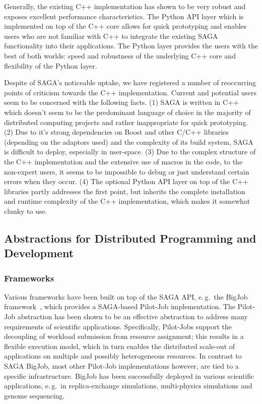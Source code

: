 \documentclass{article}
\begin{document}
Generally, the existing C++ implementation has shown to be very robust
and exposes excellent performance characteristics. The Python API
layer which is implemented on top of the C++ core allows for quick
prototyping and enables users who are not familiar with C++ to
integrate the existing SAGA functionality into their applications. The
Python layer provides the users with the best of both worlds: speed
and robustness of the underlying C++ core and flexibility of the
Python layer.

Despite of SAGA's noticeable uptake, we have registered a number of
reoccurring points of criticism towards the C++
implementation. Current and potential users seem to be concerned with
the following facts. (1) SAGA is written in C++ which doesn't seem to
be the predominant language of choice in the majority of distributed
computing projects and rather inappropriate for quick prototyping. (2)
Due to it's strong dependencies on Boost and other C/C++ libraries
(depending on the adaptors used) and the complexity of its build
system, SAGA is difficult to deploy, especially in user-space. (3) Due
to the complex structure of the C++ implementation and the extensive
use of macros in the code, to the non-expert users, it seems to be
impossible to debug or just understand certain errors when they
occur.  (4) The optional Python API layer on top of the C++ libraries partly 
addresses the first point, but inherits the complete installation and 
runtime complexity of the C++ implementation, which makes it somewhat clunky to use.

\subsection{Abstractions for Distributed Programming and
  Development}

\subsubsection{Frameworks}

Various frameworks have been built on top of the SAGA API, e.\,g.\ the BigJob
framework~\cite{saga_bigjob_condor_cloud}, which provides a SAGA-based
Pilot-Job implementation. The Pilot-Job abstraction has been shown to be an
effective abstraction to address many requirements of scientific applications.
Specifically, Pilot-Jobs support the decoupling of workload submission from
resource assignment; this results in a flexible execution model, which in turn
enables the distributed scale-out of applications on multiple and possibly
heterogeneous resources. In contrast to SAGA BigJob, most other Pilot-Job
implementations however, are tied to a specific infrastructure. BigJob has 
been successfully deployed in various scientific applications, e.\,g.\ in 
replica-exchange simulations, multi-physics simulations and genome sequencing.
\end{document}

